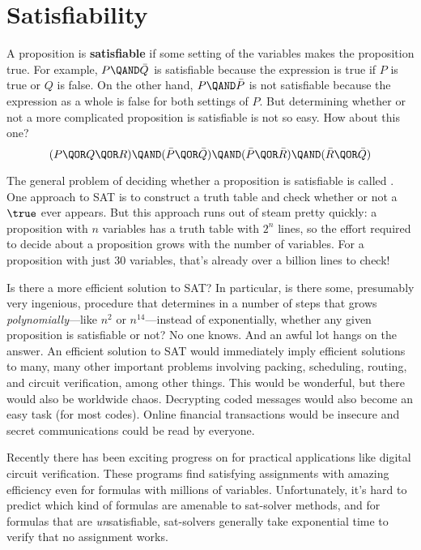 \section{Satisfiability}\label{SAT_sec}

A proposition is \textbf{satisfiable} if some setting of the variables
makes the proposition true.  For example, $P \QAND \bar{Q}$ is
satisfiable because the expression is true if $P$ is true or $Q$ is
false.  On the other hand, $P \QAND \bar{P}$ is not satisfiable because
the expression as a whole is false for both settings of $P$.  But
determining whether or not a more complicated proposition is satisfiable
is not so easy.  How about this one?
%
\[
(P \QOR Q \QOR R) \QAND (\bar P \QOR \bar Q)
                  \QAND (\bar P \QOR \bar R)
                  \QAND (\bar R \QOR \bar Q)
\]

The general problem of deciding whether a proposition is satisfiable
is called .  One approach to SAT is to construct a truth
table and check whether or not a $\true$ ever appears.  But this
approach runs out of steam pretty quickly: a proposition with $n$
variables has a truth table with $2^n$ lines, so the effort required
to decide about a proposition grows  with the
number of variables.  For a proposition with just 30 variables, that's
already over a billion lines to check!

Is there a more  efficient solution
to SAT?  In particular, is there some, presumably very ingenious,
procedure that determines in a number of steps that grows
\emph{polynomially}---like $n^2$ or $n^{14}$---instead of
exponentially, whether any given proposition is satisfiable or not?
No one knows.  And an awful lot hangs on the answer.  An efficient
solution to SAT would immediately imply efficient solutions to many,
many other important problems involving packing, scheduling, routing,
and circuit verification, among other things.  This would be
wonderful, but there would also be worldwide chaos.  Decrypting coded
messages would also become an easy task (for most codes).  Online
financial transactions would be insecure and secret communications
could be read by everyone.

Recently there has been exciting progress on  for
practical applications like digital circuit verification.  These
programs find satisfying assignments with amazing efficiency even for
formulas with millions of variables.  Unfortunately, it's hard to
predict which kind of formulas are amenable to sat-solver methods, and
for formulas that are \emph{un}satisfiable, sat-solvers generally take
exponential time to verify that no assignment works.

